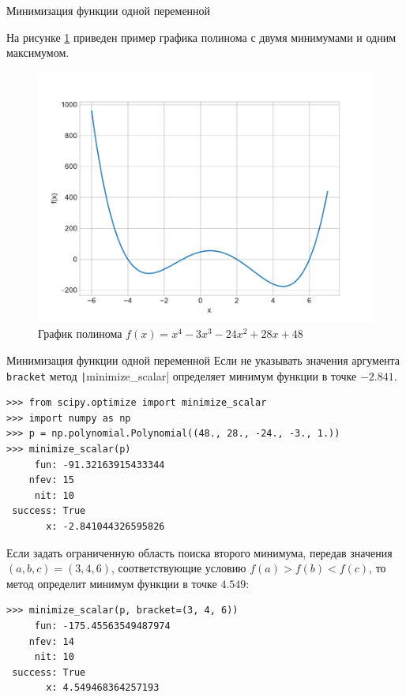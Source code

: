\documentclass[aspectratio=169, mathserif]{beamer}	%
\begin{document}
\begin{frame}[fragile]{Минимизация функции одной переменной}
\scriptsize
\begin{minipage}{.4\textwidth}
На рисунке \ref{fig:figure_40} приведен пример графика полинома с двумя минимумами и одним максимумом.
\vfill
\end{minipage}
\begin{minipage}{.59\textwidth}
\begin{figure}[h!]
	\centering
	\includegraphics[width=\linewidth]{./pics/Figure_40}
	\caption{График полинома $f(x) = x^4 - 3x^3 - 24x^2 + 28x + 48$}
	\label{fig:figure_40}
\end{figure}
\end{minipage}
\vfill
\end{frame}

\begin{frame}[fragile]{Минимизация функции одной переменной}
\scriptsize
Если не указывать значения аргумента \texttt{bracket} метод \texttt|minimize_scalar| определяет минимум функции в точке $-2.841$.
\vfill
\begin{verbatim}
>>> from scipy.optimize import minimize_scalar
>>> import numpy as np
>>> p = np.polynomial.Polynomial((48., 28., -24., -3., 1.))
>>> minimize_scalar(p)
     fun: -91.32163915433344
    nfev: 15
     nit: 10
 success: True
       x: -2.841044326595826
\end{verbatim}
\vfill
Если задать ограниченную область поиска второго минимума, передав значения $(a, b, c) = (3, 4, 6)$, соответствующие условию $f(a) > f(b) < f(c)$, то метод определит минимум функции в точке $4.549$:
\vfill
\begin{verbatim}
>>> minimize_scalar(p, bracket=(3, 4, 6))
     fun: -175.45563549487974
    nfev: 14
     nit: 10
 success: True
       x: 4.549468364257193
\end{verbatim}
\vfill
\end{frame}
\end{document}
